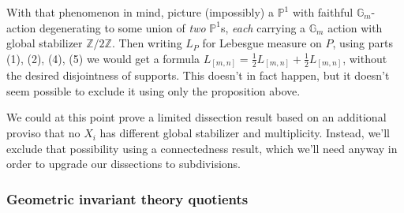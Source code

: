 \documentclass[11pt]{amsart}
\theoremstyle{definition}
\newcommand{\ZZ}{\mathbb{Z}}
\newcommand{\PP}{\mathbb{P}}
\newcommand\Gm{{\mathbb G}_m}
\begin{document}
With that phenomenon in mind, picture (impossibly) a $\PP^1$ with faithful
$\Gm$-action degenerating to some union of {\em two} $\PP^1$s, {\em each}
carrying a $\Gm$ action with global stabilizer $\ZZ/2\ZZ$. Then writing $L_P$
for Lebesgue measure on $P$, using parts (1), (2), (4), (5) we would
get a formula $L_{[m,n]} = \frac 1 2 L_{[m,n]} + \frac 1 2 L_{[m,n]}$,
without the desired disjointness of supports. This doesn't in fact
happen, but it doesn't seem possible to exclude it using only the
proposition above.

We could at this point prove a limited dissection result based on an additional
proviso that no $X_i$ has different global stabilizer and multiplicity.
Instead, we'll exclude that possibility using a connectedness result,
which we'll need anyway in order to upgrade our dissections to subdivisions.




\subsubsection{Geometric invariant theory quotients}
\end{document}
